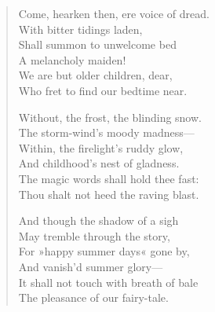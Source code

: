 \vspace*{\fill}
\begin{verse}
	\begin{altverse}
Come, hearken then, ere voice of dread.\\
With bitter tidings laden,\\
Shall summon to unwelcome bed\\
A melancholy maiden!\\
We are but older children, dear,\\
Who fret to find our bedtime near.
\end{altverse}

	\begin{altverse}
Without, the frost, the blinding snow.\\
The storm-wind’s moody madness—\\
Within, the firelight’s ruddy glow,\\
And childhood’s nest of gladness.\\
The magic words shall hold thee fast:\\
Thou shalt not heed the raving blast.
\end{altverse}

	\begin{altverse}
And though the shadow of a sigh\\
May tremble through the story,\\
For »happy summer days« gone by,\\
And vanish’d summer glory—\\
It shall not touch with breath of bale\\
The pleasance of our fairy-tale.
\end{altverse}
\end{verse}
\vfill